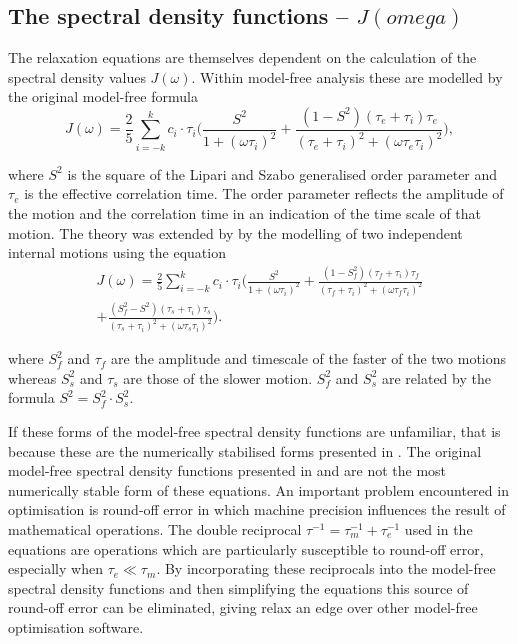 \begin{htmlonly}
\begin{htmlonly}
\begin{htmlonly}
    \subsection{The spectral density functions -- $J(omega)$}
\end{htmlonly}

The relaxation equations are themselves dependent on the calculation of the spectral density values $J(\omega)$.
Within model-free analysis these are modelled by the original model-free formula \citep{LipariSzabo82a, LipariSzabo82b}
\begin{equation} \label{eq: J(w) model-free generic}
    J(\omega) = \frac{2}{5} \sum_{i=-k}^k c_i \cdot \tau_i \Bigg(
        \frac{S^2}{1 + (\omega \tau_i)^2}
        + \frac{(1 - S^2)(\tau_e + \tau_i)\tau_e}{(\tau_e + \tau_i)^2 + (\omega \tau_e \tau_i)^2}
    \Bigg),
\end{equation}

\noindent where $S^2$ is the square of the Lipari and Szabo generalised order parameter and $\tau_e$ is the effective correlation time.
The order parameter reflects the amplitude of the motion and the correlation time in an indication of the time scale of that motion.
The theory was extended by \citet{Clore90a} by the modelling of two independent internal motions using the equation
\begin{multline} \label{eq: J(w) model-free ext generic}
    J(\omega) = \frac{2}{5} \sum_{i=-k}^k c_i \cdot \tau_i \Bigg(
        \frac{S^2}{1 + (\omega \tau_i)^2}
        + \frac{(1 - S^2_f)(\tau_f + \tau_i)\tau_f}{(\tau_f + \tau_i)^2 + (\omega \tau_f \tau_i)^2}       \\
        + \frac{(S^2_f - S^2)(\tau_s + \tau_i)\tau_s}{(\tau_s + \tau_i)^2 + (\omega \tau_s \tau_i)^2}
    \Bigg).
\end{multline}

\noindent where $S^2_f$ and $\tau_f$ are the amplitude and timescale of the faster of the two motions whereas $S^2_s$ and $\tau_s$ are those of the slower motion.
$S^2_f$ and $S^2_s$ are related by the formula $S^2 = S^2_f \cdot S^2_s$.

If these forms of the model-free spectral density functions are unfamiliar, that is because these are the numerically stabilised forms presented in \citet{dAuvergneGooley08a}.
The original model-free spectral density functions presented in \citet{LipariSzabo82a} and \citet{Clore90a} are not the most numerically stable form of these equations.
An important problem encountered in optimisation is round-off error in which machine precision influences the result of mathematical operations.
The double reciprocal $\tau^{-1} = \tau_m^{-1} + \tau_e^{-1}$ used in the equations are operations which are particularly susceptible to round-off error, especially when $\tau_e \ll \tau_m$.
By incorporating these reciprocals into the model-free spectral density functions and then simplifying the equations this source of round-off error can be eliminated, giving relax an edge over other model-free optimisation software.



\end{htmlonly}
\end{htmlonly}
